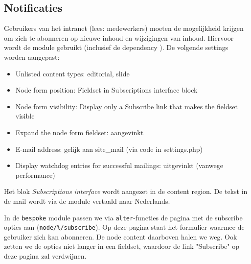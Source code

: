 \subsection{Notificaties}\label{notificaties}

Gebruikers van het intranet (lees: medewerkers) moeten de mogelijkheid krijgen om zich te abonneren op nieuwe inhoud en wijzigingen van inhoud. Hiervoor wordt de  module gebruikt (inclusief de dependency ). De volgende settings worden aangepast:
\begin{itemize}
\item Unlisted content types: editorial, slide
\item Node form position: Fieldset in Subscriptions interface block
\item Node form visibility: Display only a Subscribe link that makes the fieldset visible 
\item Expand the node form fieldset: aangevinkt
\item E-mail address: gelijk aan site\_mail (via code in settings.php)
\item Display watchdog entries for successful mailings: uitgevinkt (vanwege performance)
\end{itemize}
Het blok \emph{Subscriptions interface} wordt aangezet in de content region.
De tekst in de mail wordt via de  module vertaald naar Nederlands.

In de \texttt{bespoke} module passen we via \texttt{alter}-functies de pagina met de subscribe opties aan (\texttt{node/\%/subscribe}). Op deze pagina staat het formulier waarmee de gebruiker zich kan abonneren. De node content daarboven halen we weg. Ook zetten we de opties niet langer in een fieldset, waardoor de link "Subscribe" op deze pagina zal verdwijnen.

